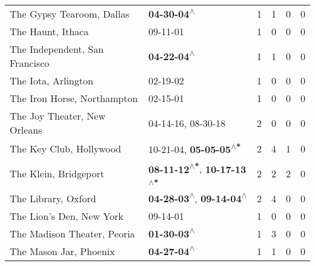\begin{supertabular}{p{0.4\textwidth}p{0.3\textwidth}p{0.05\textwidth}p{0.05\textwidth}p{0.05\textwidth}p{0.05\textwidth}}
                                                    The Gypsy Tearoom, Dallas &                                                 \textbf{04-30-04\textsuperscript{$\wedge$}} &  1 &  1 &  0 &  0 \\
                                                            The Haunt, Ithaca &                                                                  09-11-01\textsuperscript{} &  1 &  0 &  0 &  0 \\
                                               The Independent, San Francisco &                                                 \textbf{04-22-04\textsuperscript{$\wedge$}} &  1 &  1 &  0 &  0 \\
                                                          The Iota, Arlington &                                                                  02-19-02\textsuperscript{} &  1 &  0 &  0 &  0 \\
                                                  The Iron Horse, Northampton &                                                                  02-15-01\textsuperscript{} &  1 &  0 &  0 &  0 \\
                                                The Joy  Theater, New Orleans &                                      04-14-16\textsuperscript{}, 08-30-18\textsuperscript{} &  2 &  0 &  0 &  0 \\
                                                      The Key Club, Hollywood &                    10-21-04\textsuperscript{}, \textbf{05-05-05\textsuperscript{$\wedge$*}} &  2 &  4 &  1 &  0 \\
                                                        The Klein, Bridgeport &  \textbf{08-11-12\textsuperscript{$\wedge$*}}, \textbf{10-17-13\textsuperscript{$\wedge$*}} &  2 &  2 &  2 &  0 \\
                                                          The Library, Oxford &    \textbf{04-28-03\textsuperscript{$\wedge$}}, \textbf{09-14-04\textsuperscript{$\wedge$}} &  2 &  4 &  0 &  0 \\
                                                     The Lion's Den, New York &                                                                  09-14-01\textsuperscript{} &  1 &  0 &  0 &  0 \\
                                                  The Madison Theater, Peoria &                                                 \textbf{01-30-03\textsuperscript{$\wedge$}} &  1 &  3 &  0 &  0 \\
                                                       The Mason Jar, Phoenix &                                                 \textbf{04-27-04\textsuperscript{$\wedge$}} &  1 &  1 &  0 &  0 \\

\end{supertabular}
